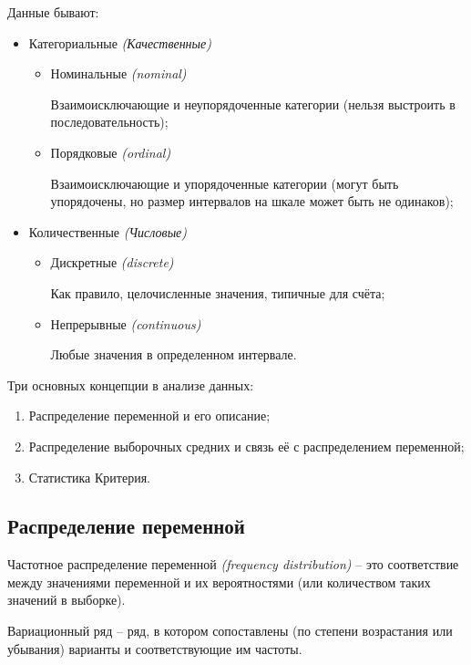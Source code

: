 Данные бывают:

\begin{itemize}
	\item Категориальные \textit{(Качественные)}
	\begin{itemize}
		\item Номинальные \textit{(nominal)}
		
		Взаимоисключающие и неупорядоченные категории (нельзя выстроить в последовательность);
		
		\item Порядковые \textit{(ordinal)}
		
		Взаимоисключающие и упорядоченные категории (могут быть упорядочены, но размер интервалов на шкале может быть не одинаков);
	\end{itemize}
	\item Количественные \textit{(Числовые)}
	\begin{itemize}
		\item Дискретные \textit{(discrete)}
		
		Как правило, целочисленные значения, типичные для счёта;
		
		\item Непрерывные \textit{(continuous)}
		
		Любые значения в определенном интервале.
	\end{itemize}
\end{itemize}

Три основных концепции в анализе данных:

\begin{enumerate}
	\item Распределение переменной и его описание;
	\item Распределение выборочных средних и связь её с распределением переменной;
	\item Статистика Критерия.
\end{enumerate}

\subsection*{Распределение переменной}

Частотное распределение переменной \textit{(frequency distribution)} -- это соответствие между значениями переменной и их вероятностями (или количеством таких значений в выборке).

Вариационный ряд -- ряд, в котором сопоставлены (по степени возрастания или убывания) варианты и соответствующие им частоты.

